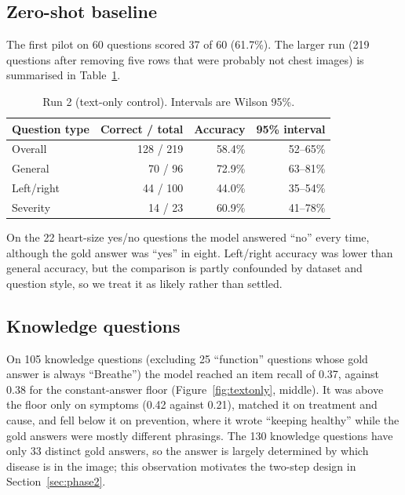 \documentclass[11pt,a4paper]{article}
\begin{document}
\subsection{Zero-shot baseline}\label{sec:baseline}
The first pilot on 60 questions scored 37 of 60 (61.7\%). The larger run (219 questions after removing five rows that were
probably not chest images) is summarised in Table~\ref{tab:baseline}.

\begin{table}[H]
\centering
\small
\begin{tabular}{@{}lrrr@{}}
\toprule
Question type & Correct / total & Accuracy & 95\% interval \\
\midrule
Overall & 128 / 219 & 58.4\% & 52--65\% \\
General & 70 / 96 & 72.9\% & 63--81\% \\
Left/right & 44 / 100 & 44.0\% & 35--54\% \\
Severity & 14 / 23 & 60.9\% & 41--78\% \\
\bottomrule
\end{tabular}
\caption{Run 2 (text-only control). Intervals are Wilson 95\%.}
\label{tab:baseline}
\end{table}

On the 22 heart-size yes/no questions the model answered ``no'' every time, although the gold answer was ``yes'' in eight.
Left/right accuracy was lower than general accuracy, but the comparison is partly confounded by dataset and question
style, so we treat it as likely rather than settled.

\subsection{Knowledge questions}
On 105 knowledge questions (excluding 25 ``function'' questions whose gold answer is always ``Breathe'') the model reached
an item recall of 0.37, against 0.38 for the constant-answer floor (Figure~\ref{fig:textonly}, middle).
It was above the floor only on symptoms (0.42 against 0.21), matched it on treatment and cause, and fell below it on
prevention, where it wrote ``keeping healthy'' while the gold answers were mostly different phrasings.
The 130 knowledge questions have only 33 distinct gold answers, so the answer is largely determined by which disease is in the
image; this observation motivates the two-step design in Section~\ref{sec:phase2}.
\end{document}
